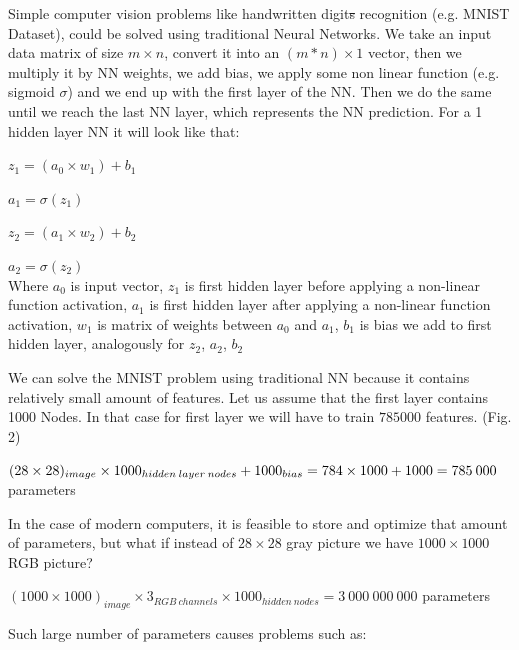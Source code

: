 \documentclass[letterpaper, 10 pt, conference]{ieeeconf}  %
\begin{document}
Simple computer vision problems like handwritten digit\st{s} recognition (e.g. MNIST Dataset), could be solved using traditional Neural Networks. We take an input data matrix of size $m \times  n$, convert it into an $(m*n) \times 1 $ vector, then we multiply it by NN weights, we add bias, we apply some non linear function (e.g. sigmoid $\sigma$) and we end up with the first layer of the NN. Then we do the same until we reach the last NN layer, which represents the NN prediction. For a 1 hidden layer NN it will look like that: 

$z_1 = (a_0 \times w_1) + b_1 $

$a_1 = \sigma(z_1) $

$z_2 = (a_1 \times w_2 ) + b_2 $

$a_2 = \sigma(z_2) $
\medskip \\
Where $a_0$ is input vector, $z_1$ is first hidden layer before applying a non-linear function activation, $a_1$ is first hidden layer after applying a non-linear function activation, $w_1$ is matrix of weights between $a_0$ and $a_1$, $b_1$ is bias we add to first hidden layer, analogously for $z_2$, $a_2$, $b_2$

We can solve the MNIST problem using traditional NN because it contains relatively small amount of features. Let us assume that the first layer contains 1000 Nodes. In that case for first layer we will have to train $785000$ features. (Fig. 2)

$(28 \times 28)_{image} \times 1000_{hidden \:layer \: nodes} + 1000_{bias} = \\ 784 \times 1000 + 1000 = 785 \: 000$ parameters

\vspace{5mm} %

In the case of modern computers, it is feasible to store and optimize that amount of parameters, but what if instead of $28 \times 28$ gray picture we have $1000 \times 1000$ RGB picture?

\vspace{5mm} %

$(1000 \times 1000)_{image} \times 3_{RGB \: channels} \times 1000_{hidden  \: nodes} = 3 \: 000 \: 000 \:000$ parameters

\vspace{5mm} %

Such large number of parameters causes problems such as:
\end{document}
